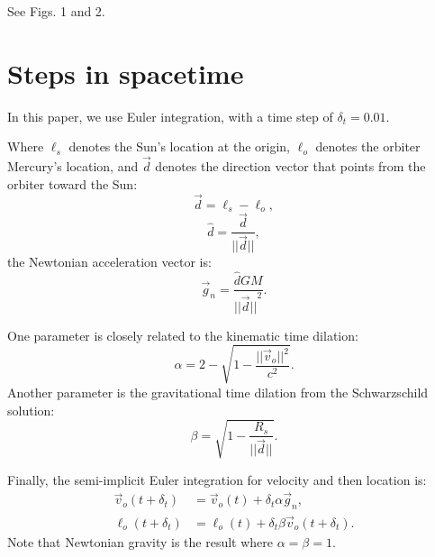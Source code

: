 \documentclass[12pt]{article}
\begin{document}

See Figs. 1 and 2.


\section{Steps in spacetime}

In this paper, we use Euler integration, with a time step of $\delta_{t} = 0.01$.

Where $\ell_s$ denotes the Sun's location at the origin, $\ell_o$ denotes the orbiter Mercury's location, and $\vec{d}$ denotes the direction vector that points from the orbiter toward the Sun:
\begin{equation}
\label{direction_vector}
\vec{d} = \ell_{s} - \ell_{o},	
\end{equation}
\begin{equation}
\label{direction_unit_vector}
\hat{d} = \frac{\vec{d}}{\lvert\lvert \vec{d} \rvert\rvert},
\end{equation}
the Newtonian acceleration vector is:
\begin{equation}
\label{newton}
\vec{g}_n = \frac{\hat{d} G M}{{\lvert\lvert \vec{d} \rvert\rvert}^2}.
\end{equation}

One parameter is closely related to the kinematic time dilation:
\begin{equation}
\label{eq_kinematic}
\alpha = 2 - \sqrt{1 - \frac{\lvert\lvert \vec{v}_{o}\rvert\rvert^2}{c^2}}.
\end{equation}
Another parameter is the gravitational time dilation from the Schwarzschild solution:
\begin{equation}
\label{eq_gravitational}
\beta = \sqrt{1 - \frac{R_{s}}{\lvert \lvert \vec{d} \rvert \rvert}}.
\end{equation}

Finally, the semi-implicit Euler integration for velocity and then location is:
\begin{align}
\label{eq_velocity}
\vec{v}_{o}(t + \delta_t) &= \vec{v}_{o}(t) + \delta_{t} \alpha \vec{g}_n, \\
\label{eq_position}
\ell_{o}(t + \delta_t) &= \ell_{o}(t) + \delta_{t} \beta \vec{v}_{o}(t + \delta_t).
\end{align}
Note that Newtonian gravity is the result where $\alpha = \beta = 1$.
\end{document}
